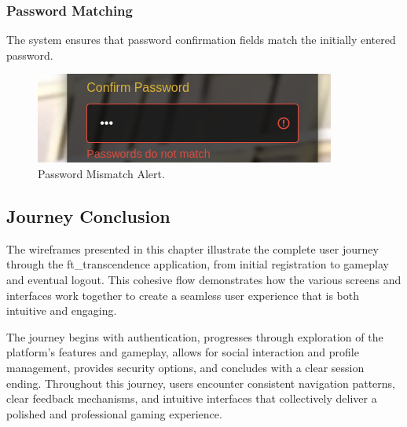 \subsubsection{Password Matching} The system ensures that password confirmation fields match the initially entered password.

\begin{figure}[H]
    \centering
    \includegraphics[width=0.65\linewidth]{Figures/images/new_images/ErrorConfirmPassword.png}
    \caption{Password Mismatch Alert.} %
    \label{fig:error-confirm-password-journey}
\end{figure}

\subsection{Journey Conclusion}

The wireframes presented in this chapter illustrate the complete user journey through the ft\_transcendence application, from initial registration to gameplay and eventual logout. This cohesive flow demonstrates how the various screens and interfaces work together to create a seamless user experience that is both intuitive and engaging.

The journey begins with authentication, progresses through exploration of the platform's features and gameplay, allows for social interaction and profile management, provides security options, and concludes with a clear session ending. Throughout this journey, users encounter consistent navigation patterns, clear feedback mechanisms, and intuitive interfaces that collectively deliver a polished and professional gaming experience.
